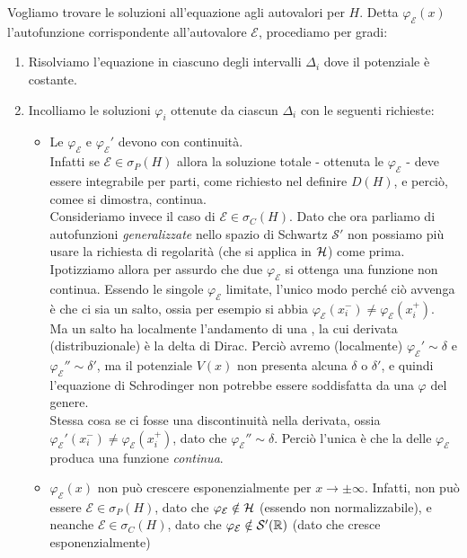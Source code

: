 \documentclass[../../FisicaTeorica.tex]{subfiles}
\begin{document}
Vogliamo trovare le soluzioni all'equazione agli autovalori per $H$. Detta  $\varphi_{\mathcal{E}}(x)$ l'autofunzione corrispondente all'autovalore $\mathcal{E}$, procediamo per gradi:
\begin{enumerate}
\item Risolviamo l'equazione in ciascuno degli intervalli $\Delta_i$ dove il potenziale è costante.
\item Incolliamo le soluzioni $\varphi_i$ ottenute da ciascun $\Delta_i$ con le seguenti richieste:
\begin{itemize}
\item Le $\varphi_\mathcal{E}$ e $\varphi_{\mathcal{E}}'$ devono  con continuità.\\ Infatti se $\mathcal{E}\in \sigma_P(H)$ allora la soluzione totale - ottenuta  le $\varphi_\mathcal{E}$ - deve essere 
integrabile per parti, come richiesto nel definire $D(H)$, e perciò, comee si dimostra, continua.\\
Consideriamo invece il caso di $\mathcal{E}\in \sigma_C(H)$. Dato che ora parliamo di autofunzioni \textit{generalizzate} nello spazio di Schwartz $\mathcal{S}'$ non possiamo più usare la richiesta di regolarità (che si applica in $\mathcal{H}$) come prima. Ipotizziamo allora per assurdo che  due $\varphi_\mathcal{E}$ si ottenga una funzione non continua. Essendo le singole $\varphi_\mathcal{E}$ limitate, l'unico modo perché ciò avvenga è che ci sia un salto, ossia per esempio si abbia $\varphi_{\mathcal{E}}(x_i^-)\neq \varphi_{\mathcal{E}}(x_i^+)$.\\
Ma un salto ha localmente l'andamento di una , la cui derivata (distribuzionale) è la delta di Dirac. Perciò avremo (localmente) $\varphi_{\mathcal{E}}'\sim \delta$ e $\varphi_{\mathcal{E}}''\sim \delta'$, ma il potenziale $V(x)$ non presenta alcuna $\delta$ o $\delta'$, e quindi l'equazione di Schrodinger non potrebbe essere soddisfatta da una $\varphi$ del genere.\\
Stessa cosa se ci fosse una discontinuità nella derivata, ossia $\varphi_\mathcal{E}'(x_i^-)\neq \varphi_\mathcal{E}(x_i^+)$, dato che $\varphi_{\mathcal{E}}''\sim\delta$. Perciò l'unica è che la  delle $\varphi_\mathcal{E}$ produca una funzione \textit{continua}.
\item $\varphi_{\mathcal{E}}(x)$ non può crescere esponenzialmente per $x\to\pm \infty$. Infatti, non può essere $\mathcal{E}\in \sigma_P(H)$, dato che $\varphi_{\mathcal{E}}\notin \mathcal{H}$ (essendo non normalizzabile), e neanche $\mathcal{E}\in \sigma_C(H)$, dato che $\varphi_\mathcal{E}\notin \mathcal{S}'(\mathbb{R})$ (dato che cresce esponenzialmente)
\end{itemize} 
\end{enumerate}
\end{document}
